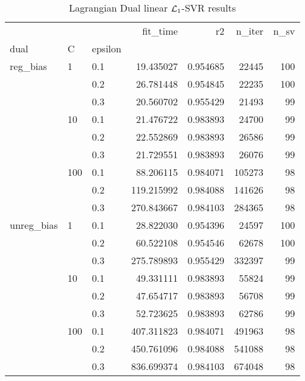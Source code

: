 \begin{table}[H]
\centering
\caption{Lagrangian Dual linear $\protect \mathcal{L}_1$-SVR results}
\label{linear_lagrangian_dual_l1_svr_cv_results}
\begin{tabular}{lllrrrr}
\toprule
           &     &     &    fit\_time &        r2 &  n\_iter &  n\_sv \\
dual & C & epsilon &             &           &         &       \\
\midrule
reg\_bias & 1   & 0.1 &   19.435027 &  0.954685 &   22445 &   100 \\
           &     & 0.2 &   26.781448 &  0.954845 &   22235 &   100 \\
           &     & 0.3 &   20.560702 &  0.955429 &   21493 &    99 \\
           & 10  & 0.1 &   21.476722 &  0.983893 &   24700 &    99 \\
           &     & 0.2 &   22.552869 &  0.983893 &   26586 &    99 \\
           &     & 0.3 &   21.729551 &  0.983893 &   26076 &    99 \\
           & 100 & 0.1 &   88.206115 &  0.984071 &  105273 &    98 \\
           &     & 0.2 &  119.215992 &  0.984088 &  141626 &    98 \\
           &     & 0.3 &  270.843667 &  0.984103 &  284365 &    98 \\
unreg\_bias & 1   & 0.1 &   28.822030 &  0.954396 &   24597 &   100 \\
           &     & 0.2 &   60.522108 &  0.954546 &   62678 &   100 \\
           &     & 0.3 &  275.789893 &  0.955429 &  332397 &    99 \\
           & 10  & 0.1 &   49.331111 &  0.983893 &   55824 &    99 \\
           &     & 0.2 &   47.654717 &  0.983893 &   56708 &    99 \\
           &     & 0.3 &   52.723625 &  0.983893 &   62786 &    99 \\
           & 100 & 0.1 &  407.311823 &  0.984071 &  491963 &    98 \\
           &     & 0.2 &  450.761096 &  0.984088 &  541088 &    98 \\
           &     & 0.3 &  836.699374 &  0.984103 &  674048 &    98 \\
\bottomrule
\end{tabular}
\end{table}
